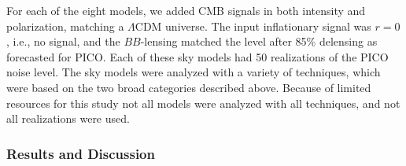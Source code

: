 \documentclass[PICOReport.tex]{subfiles}
\begin{document}
For each of the eight models, we added CMB signals in both intensity and polarization, matching a $\Lambda$CDM universe. The input inflationary signal was $r=0$, i.e., no signal, and the $BB$-lensing matched the level after 85\% delensing as forecasted for PICO. Each of these sky models had 50 realizations of the PICO noise level. 
The sky models were analyzed with a variety of techniques, which were based on the two broad categories described above. Because of limited resources for this study not all models were analyzed with all techniques, and not all realizations were used. 

\subsubsection{Results and Discussion}
\label{sec:foregrounds_results}
\end{document}

